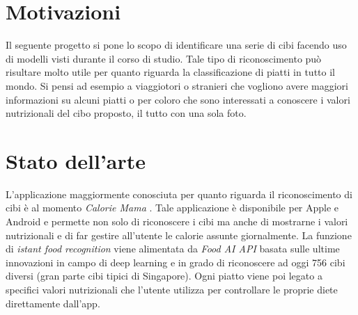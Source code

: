 \documentclass[11pt, a4paper, titlepage]{article}
\begin{document}
\begin{frontespizio}
\Margini{2.5cm}{3cm}{2.5cm}{3cm}
\Sottotitolo{}
\end{frontespizio}
%


\tableofcontents
\newpage

\section{Motivazioni}
Il seguente progetto si pone lo scopo di identificare una serie di cibi facendo uso di modelli visti durante il corso di studio. Tale tipo di riconoscimento può risultare molto utile per quanto riguarda la classificazione di piatti in tutto il mondo. Si pensi ad esempio a viaggiotori o stranieri che vogliono avere maggiori informazioni su alcuni piatti o per coloro che sono interessati a conoscere i valori nutrizionali del cibo proposto, il tutto con una sola foto. 

\section{Stato dell'arte}
L'applicazione maggiormente conosciuta per quanto riguarda il riconoscimento di cibi è al momento \emph{Calorie Mama} \cite{calorie-mama}. Tale applicazione è disponibile per Apple e Android e permette non solo di riconoscere i cibi ma anche di mostrarne i valori nutrizionali e di far gestire all'utente le calorie assunte giornalmente. La funzione di \textit{istant food recognition} viene alimentata da \textit{Food AI API} \cite{foodai} basata sulle ultime innovazioni in campo di deep learning e in grado di riconoscere ad oggi 756 cibi diversi (gran parte cibi tipici di Singapore). Ogni piatto viene poi legato a specifici valori nutrizionali che l'utente utilizza per controllare le proprie diete direttamente dall'app.
\end{document}

